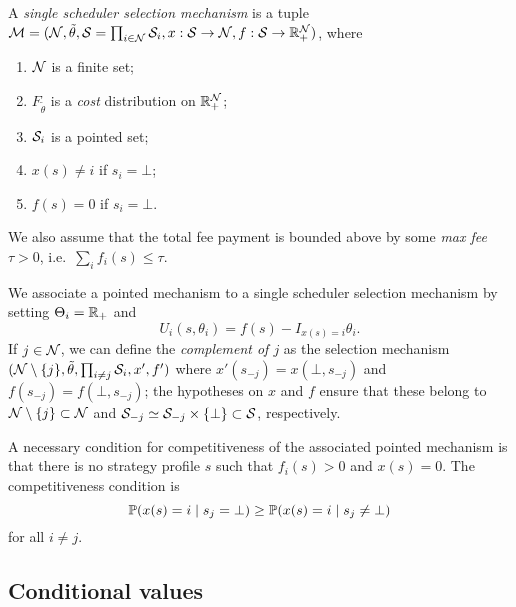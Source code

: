 \begin{definition}

  A \emph{single scheduler selection mechanism} is a tuple $\mathcal{M}=(\mathcal{N}, \tilde\theta, \mathcal{S}=\prod_{i\in\mathcal{N}}\mathcal{S}_i,x:\mathcal{S}\rightarrow\mathcal{N},f:\mathcal{S}\rightarrow\mathbb{R}_+^{\mathcal{N}})$, where
  \begin{enumerate}
    \item $\mathcal{N}$ is a finite set;
    \item $F_{\tilde\theta}$ is a \emph{cost} distribution on $\mathbb{R}_+^{\mathcal{N}}$;
    \item $\mathcal{S}_i$ is a pointed set;
    \item $x(s) \neq i$ if $s_i=\bot$;
    \item $f(s) = 0$ if $s_i=\bot$.
  \end{enumerate}
  We also assume that the total fee payment is bounded above by some \emph{max fee} $\tau>0$, i.e.~$\sum_if_i(s)\leq\tau$.
  
  We associate a pointed mechanism to a single scheduler selection mechanism by setting $\Theta_i=\mathbb{R}_+$ and
  \[
    U_i(s,\theta_i) = f(s) - I_{x(s)=i}\theta_i.
  \]
  If $j\in \mathcal{N}$, we can define the \emph{complement of $j$} as the selection mechanism $(\mathcal{N}\setminus\{j\},\tilde\theta,\prod_{i\neq j}\mathcal{S}_i,x',f')$ where $x'(s_{-j}) = x(\bot,s_{-j})$ and $f(s_{-j})=f(\bot,s_{-j})$; the hypotheses on $x$ and $f$ ensure that these belong to $\mathcal{N}\setminus\{j\}\subset\mathcal{N}$ and $\mathcal{S}_{-j}\simeq \mathcal{S}_{-j}\times\{\bot\}\subset \mathcal{S}$, respectively.

  A necessary condition for competitiveness of the associated pointed mechanism is that there is no strategy profile $s$ such that $f_i(s)>0$ and $x(s)=0$.
  The competitiveness condition is
  \[
    \mathbb{P}(x(s)=i \mid s_j = \bot) \geq \mathbb{P}(x(s)=i \mid s_j\neq\bot)
  \]
  for all $i\neq j$.

\end{definition}


\subsection{Conditional values}

